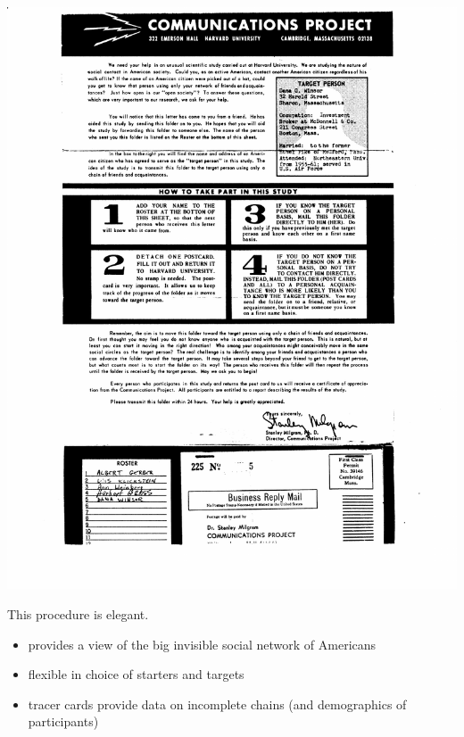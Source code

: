 \documentclass[aspectratio=169]{beamer}
\begin{document}
\begin{frame}

\begin{center}
\includegraphics[height=0.9\textheight]{figures/small_world_dossier}
\end{center}

\end{frame}
\begin{frame}

This procedure is elegant.\pause

\begin{itemize}
\item provides a view of the big invisible social network of Americans
\pause
\item flexible in choice of starters and targets
\pause
\item tracer cards provide data on incomplete chains (and demographics of participants)
\end{itemize}


\end{frame}
\end{document}
